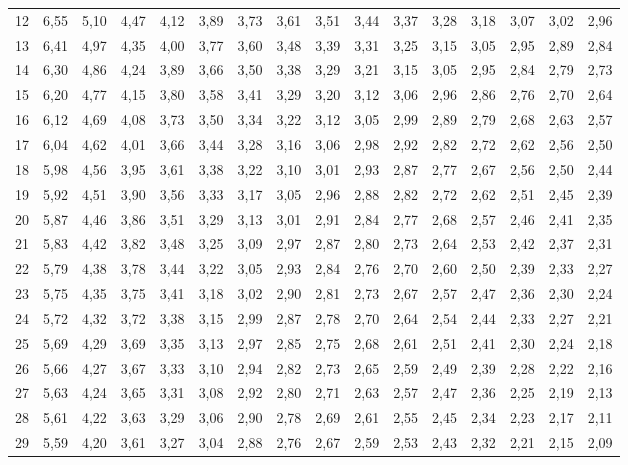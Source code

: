 \documentclass[a4paper,10pt]{extarticle}
\begin{document}
\begin{center}
\begin{tabular}{r|rrrrrrrrrrrrrrr}
12 & 6,55 & 5,10 & 4,47 & 4,12 & 3,89 & 3,73 & 3,61 & 3,51 & 3,44 & 3,37 & 3,28 & 3,18 & 3,07 & 3,02 & 2,96\\
13 & 6,41 & 4,97 & 4,35 & 4,00 & 3,77 & 3,60 & 3,48 & 3,39 & 3,31 & 3,25 & 3,15 & 3,05 & 2,95 & 2,89 & 2,84\\
14 & 6,30 & 4,86 & 4,24 & 3,89 & 3,66 & 3,50 & 3,38 & 3,29 & 3,21 & 3,15 & 3,05 & 2,95 & 2,84 & 2,79 & 2,73\\
15 & 6,20 & 4,77 & 4,15 & 3,80 & 3,58 & 3,41 & 3,29 & 3,20 & 3,12 & 3,06 & 2,96 & 2,86 & 2,76 & 2,70 & 2,64\\
16 & 6,12 & 4,69 & 4,08 & 3,73 & 3,50 & 3,34 & 3,22 & 3,12 & 3,05 & 2,99 & 2,89 & 2,79 & 2,68 & 2,63 & 2,57\\
17 & 6,04 & 4,62 & 4,01 & 3,66 & 3,44 & 3,28 & 3,16 & 3,06 & 2,98 & 2,92 & 2,82 & 2,72 & 2,62 & 2,56 & 2,50\\
18 & 5,98 & 4,56 & 3,95 & 3,61 & 3,38 & 3,22 & 3,10 & 3,01 & 2,93 & 2,87 & 2,77 & 2,67 & 2,56 & 2,50 & 2,44\\
19 & 5,92 & 4,51 & 3,90 & 3,56 & 3,33 & 3,17 & 3,05 & 2,96 & 2,88 & 2,82 & 2,72 & 2,62 & 2,51 & 2,45 & 2,39\\
20 & 5,87 & 4,46 & 3,86 & 3,51 & 3,29 & 3,13 & 3,01 & 2,91 & 2,84 & 2,77 & 2,68 & 2,57 & 2,46 & 2,41 & 2,35\\
21 & 5,83 & 4,42 & 3,82 & 3,48 & 3,25 & 3,09 & 2,97 & 2,87 & 2,80 & 2,73 & 2,64 & 2,53 & 2,42 & 2,37 & 2,31\\
22 & 5,79 & 4,38 & 3,78 & 3,44 & 3,22 & 3,05 & 2,93 & 2,84 & 2,76 & 2,70 & 2,60 & 2,50 & 2,39 & 2,33 & 2,27\\
23 & 5,75 & 4,35 & 3,75 & 3,41 & 3,18 & 3,02 & 2,90 & 2,81 & 2,73 & 2,67 & 2,57 & 2,47 & 2,36 & 2,30 & 2,24\\
24 & 5,72 & 4,32 & 3,72 & 3,38 & 3,15 & 2,99 & 2,87 & 2,78 & 2,70 & 2,64 & 2,54 & 2,44 & 2,33 & 2,27 & 2,21\\
25 & 5,69 & 4,29 & 3,69 & 3,35 & 3,13 & 2,97 & 2,85 & 2,75 & 2,68 & 2,61 & 2,51 & 2,41 & 2,30 & 2,24 & 2,18\\
26 & 5,66 & 4,27 & 3,67 & 3,33 & 3,10 & 2,94 & 2,82 & 2,73 & 2,65 & 2,59 & 2,49 & 2,39 & 2,28 & 2,22 & 2,16\\
27 & 5,63 & 4,24 & 3,65 & 3,31 & 3,08 & 2,92 & 2,80 & 2,71 & 2,63 & 2,57 & 2,47 & 2,36 & 2,25 & 2,19 & 2,13\\
28 & 5,61 & 4,22 & 3,63 & 3,29 & 3,06 & 2,90 & 2,78 & 2,69 & 2,61 & 2,55 & 2,45 & 2,34 & 2,23 & 2,17 & 2,11\\
29 & 5,59 & 4,20 & 3,61 & 3,27 & 3,04 & 2,88 & 2,76 & 2,67 & 2,59 & 2,53 & 2,43 & 2,32 & 2,21 & 2,15 & 2,09\\

\end{tabular}
\end{center}
\end{document}
